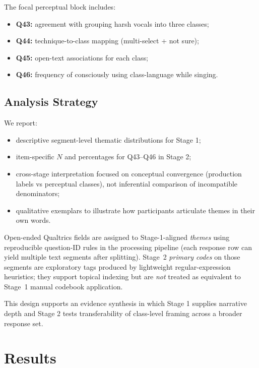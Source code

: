\documentclass{article}
\begin{document}
The focal perceptual block includes:
\begin{itemize}
    \item \textbf{Q43:} agreement with grouping harsh vocals into three classes;
    \item \textbf{Q44:} technique-to-class mapping (multi-select + not sure);
    \item \textbf{Q45:} open-text associations for each class;
    \item \textbf{Q46:} frequency of consciously using class-language while singing.
\end{itemize}

\subsection{Analysis Strategy}
We report:
\begin{itemize}
    \item descriptive segment-level thematic distributions for Stage 1;
    \item item-specific \(N\) and percentages for Q43--Q46 in Stage 2;
    \item cross-stage interpretation focused on conceptual convergence (production labels vs perceptual classes), not inferential comparison of incompatible denominators;
    \item qualitative exemplars to illustrate how participants articulate themes in their own words.
\end{itemize}

Open-ended Qualtrics fields are assigned to Stage-1-aligned \emph{themes} using reproducible question-ID rules in the processing pipeline (each response row can yield multiple text segments after splitting).
Stage~2 \emph{primary codes} on those segments are exploratory tags produced by lightweight regular-expression heuristics; they support topical indexing but are \emph{not} treated as equivalent to Stage~1 manual codebook application.

This design supports an evidence synthesis in which Stage 1 supplies narrative depth and Stage 2 tests transferability of class-level framing across a broader response set.

\section{Results}
\end{document}
